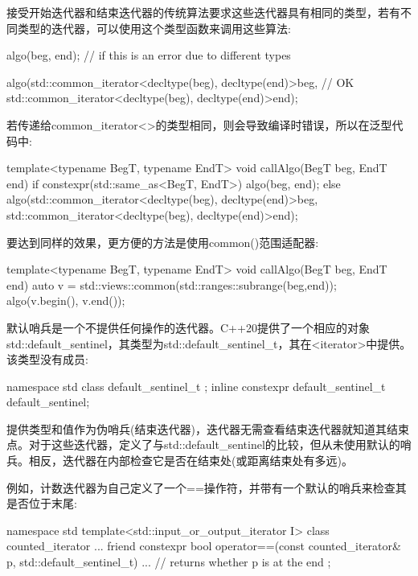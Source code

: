 接受开始迭代器和结束迭代器的传统算法要求这些迭代器具有相同的类型，若有不同类型的迭代器，可以使用这个类型函数来调用这些算法:

\begin{cpp}
algo(beg, end); // if this is an error due to different types

algo(std::common_iterator<decltype(beg), decltype(end)>{beg}, // OK
std::common_iterator<decltype(beg), decltype(end)>{end});
\end{cpp}

若传递给common\_iterator<>的类型相同，则会导致编译时错误，所以在泛型代码中:

\begin{cpp}
template<typename BegT, typename EndT>
void callAlgo(BegT beg, EndT end)
{
	if constexpr(std::same_as<BegT, EndT>) {
		algo(beg, end);
	}
	else {
		algo(std::common_iterator<decltype(beg), decltype(end)>{beg},
		std::common_iterator<decltype(beg), decltype(end)>{end});
	}
}
\end{cpp}

要达到同样的效果，更方便的方法是使用common()范围适配器:

\begin{cpp}
template<typename BegT, typename EndT>
void callAlgo(BegT beg, EndT end)
{
	auto v = std::views::common(std::ranges::subrange(beg,end));
	algo(v.begin(), v.end());
}
\end{cpp}


默认哨兵是一个不提供任何操作的迭代器。C++20提供了一个相应的对象std::default\_sentinel，其类型为std::default\_sentinel\_t，其在<iterator>中提供。该类型没有成员:

\begin{cpp}
namespace std {
	class default_sentinel_t {
	};
	inline constexpr default_sentinel_t default_sentinel{};
}
\end{cpp}

提供类型和值作为伪哨兵(结束迭代器)，迭代器无需查看结束迭代器就知道其结束点。对于这些迭代器，定义了与std::default\_sentinel的比较，但从未使用默认的哨兵。相反，迭代器在内部检查它是否在结束处(或距离结束处有多远)。

例如，计数迭代器为自己定义了一个==操作符，并带有一个默认的哨兵来检查其是否位于末尾:

\begin{cpp}
namespace std {
	template<std::input_or_output_iterator I>
	class counted_iterator {
		...
		friend constexpr bool operator==(const counted_iterator& p,
		std::default_sentinel_t) {
			... // returns whether p is at the end
		}
	};
}
\end{cpp}

